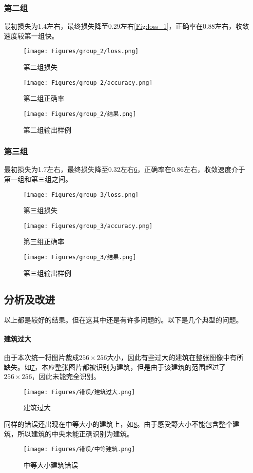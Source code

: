 \subsubsection{第二组}
最初损失为1.4左右，最终损失降至0.29左右\ref{Fig:loss_1}，正确率在0.88左右，收敛速度较第一组快。
\begin{figure}[!t]
    \centering
    \texttt{[image: Figures/group\_2/loss.png]}
    \caption{第二组损失}
    \label{Fig:loss_2}
\end{figure}
\begin{figure}[!t]
    \centering
    \texttt{[image: Figures/group\_2/accuracy.png]}
    \caption{第二组正确率}
    \label{Fig:loss_2}
\end{figure}
\begin{figure}[!t]
    \centering
    \texttt{[image: Figures/group\_2/结果.png]}
    \caption{第二组输出样例}
    \label{Fig:loss_2}
\end{figure}
\subsubsection{第三组}
最初损失为1.7左右，最终损失降至0.32左右\ref{Fig:loss_3}，正确率在0.86左右，收敛速度介于第一组和第三组之间。
\begin{figure}[!t]
    \centering
    \texttt{[image: Figures/group\_3/loss.png]}
    \caption{第三组损失}
    \label{Fig:loss_3}
\end{figure}
\begin{figure}[!t]
    \centering
    \texttt{[image: Figures/group\_3/accuracy.png]}
    \caption{第三组正确率}
    \label{Fig:loss_3}
\end{figure}
\begin{figure}[!t]
    \centering
    \texttt{[image: Figures/group\_3/结果.png]}
    \caption{第三组输出样例}
    \label{Fig:loss_3}
\end{figure}
\subsection{分析及改进}
以上都是较好的结果。但在这其中还是有许多问题的。以下是几个典型的问题。
\paragraph{建筑过大}
由于本次统一将图片裁成$256\times 256$大小，因此有些过大的建筑在整张图像中有所缺失。如\ref{Fig:big_building}，本应整张图片都被识别为建筑，但是由于该建筑的范围超过了$256\times256$，因此未能完全识别。
\begin{figure}[!t]
    \centering
    \texttt{[image: Figures/错误/建筑过大.png]}
    \caption{建筑过大}
    \label{Fig:big_building}
\end{figure}
同样的错误还出现在中等大小的建筑上，如\ref{Fig:middle_building}。由于感受野大小不能包含整个建筑，所以建筑的中央未能正确识别为建筑。
\begin{figure}[!t]
    \centering
    \texttt{[image: Figures/错误/中等建筑.png]}
    \caption{中等大小建筑错误}
    \label{Fig:middle_building}
\end{figure}
